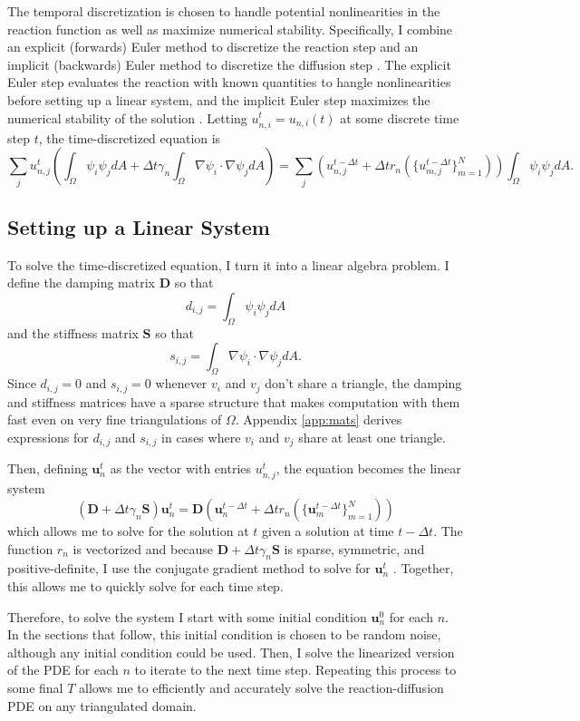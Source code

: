 The temporal discretization is chosen to handle potential nonlinearities in the reaction function as well as maximize numerical stability. Specifically, I combine an explicit (forwards) Euler method to discretize the reaction step and an implicit (backwards) Euler method to discretize the diffusion step \parencite{sellami2020accelerating}. The explicit Euler step evaluates the reaction with known quantities to hangle nonlinearities before setting up a linear system, and the implicit Euler step maximizes the numerical stability of the solution \parencite{folland2020introduction}. Letting $u_{n, i}^t = u_{n, i}(t)$ at some discrete time step $t$, the time-discretized equation is
\[
    \sum_j u_{n, j}^t \left(\int_\Omega \psi_i \psi_j dA + \Delta t \gamma_n \int_\Omega \nabla \psi_i \cdot \nabla \psi_j dA\right) = \sum_j \left(u_{n, j}^{t - \Delta t} + \Delta t r_n \left(\{u_{m, j}^{t - \Delta t}\}_{m = 1}^N\right)\right) \int_\Omega \psi_i \psi_j dA.
\]


\subsection{Setting up a Linear System}

To solve the time-discretized equation, I turn it into a linear algebra problem. I define the damping matrix $\mathbf{D}$ so that
\[
    d_{i, j} = \int_\Omega \psi_i \psi_j dA
\]
and the stiffness matrix $\mathbf{S}$ so that
\[
    s_{i, j} = \int_\Omega \nabla \psi_i \cdot \nabla \psi_j dA.
\]
Since $d_{i, j} = 0$ and $s_{i, j} = 0$ whenever $v_i$ and $v_j$ don't share a triangle, the damping and stiffness matrices have a sparse structure that makes computation with them fast even on very fine triangulations of $\Omega$. Appendix \ref{app:mats} derives expressions for $d_{i, j}$ and $s_{i, j}$ in cases where $v_i$ and $v_j$ share at least one triangle.

Then, defining $\mathbf{u}_n^t$ as the vector with entries $u_{n, j}^t$, the equation becomes the linear system
\[
    \left(\mathbf{D} + \Delta t \gamma_n \mathbf{S}\right) \mathbf{u}_n^t = \mathbf{D} \left(\mathbf{u}_n^{t - \Delta t} + \Delta t r_n \left(\{\mathbf{u}_m^{t - \Delta t}\}_{m = 1}^N\right)\right)
\]
which allows me to solve for the solution at $t$ given a solution at time $t - \Delta t$. The function $r_n$ is vectorized and because $\mathbf{D} + \Delta t \gamma_n \mathbf{S}$ is sparse, symmetric, and positive-definite, I use the conjugate gradient method to solve for $\mathbf{u}_n^t$ \parencite{nazareth2009conjugate}. Together, this allows me to quickly solve for each time step.

Therefore, to solve the system I start with some initial condition $\mathbf{u}_n^0$ for each $n$. In the sections that follow, this initial condition is chosen to be random noise, although any initial condition could be used. Then, I solve the linearized version of the PDE for each $n$ to iterate to the next time step. Repeating this process to some final $T$ allows me to efficiently and accurately solve the reaction-diffusion PDE on any triangulated domain.
